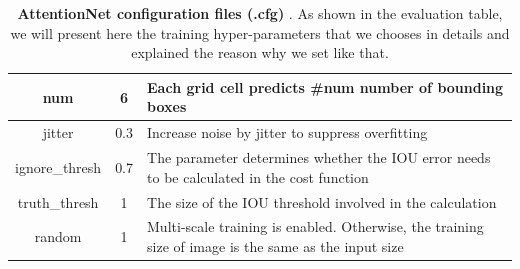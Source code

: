 \begin{table}[t]
{\begin{tabular}{@{}ccl@{}}
\multicolumn{1}{|c|}{num}            & \multicolumn{1}{c|}{6}                                                                               & \multicolumn{1}{l|}{Each grid cell predicts \#num number of bounding boxes}                                                                                                                                                                                                                                                                                                                            \\ \midrule
\multicolumn{1}{|c|}{jitter}         & \multicolumn{1}{c|}{0.3}                                                                             & \multicolumn{1}{l|}{Increase noise by jitter to suppress overfitting}                                                                                                                                                                                                                                                                                                                                  \\ \midrule
\multicolumn{1}{|c|}{ignore\_thresh} & \multicolumn{1}{c|}{0.7}                                                                             & \multicolumn{1}{l|}{The parameter determines whether the IOU error needs to be calculated  in the cost function}                                                                                                                                                                                                                                                                                       \\ \midrule
\multicolumn{1}{|c|}{truth\_thresh}  & \multicolumn{1}{c|}{1}                                                                               & \multicolumn{1}{l|}{The size of the IOU threshold involved in the calculation}                                                                                                                                                                                                                                                                                                                         \\ \midrule
\multicolumn{1}{|c|}{random}         & \multicolumn{1}{c|}{1}                                                                               & \multicolumn{1}{l|}{Multi-scale training is enabled. Otherwise, the training size of image is the same as the input size}                                                                                                                                                                                                                                                                              \\ \bottomrule
\end{tabular}}
\caption{ \textbf{AttentionNet configuration files (.cfg) }. As shown in the evaluation table, we will present here the training hyper-parameters that we chooses in details and explained the reason why we set like that.}
\end{table}


